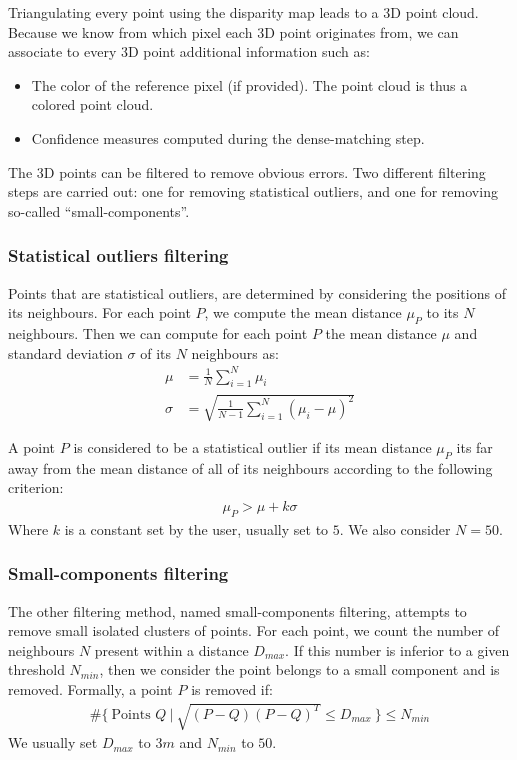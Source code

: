 Triangulating every point using the disparity map leads to a 3D point cloud. Because we know from which pixel each 3D point originates from, we can associate to every 3D point additional information such as:
\begin{itemize}
    \item The color of the reference pixel (if provided). The point cloud is thus a colored point cloud.
    \item Confidence measures computed during the dense-matching step. 
\end{itemize}

The 3D points can be filtered to remove obvious errors. Two different filtering steps are carried out: one for removing statistical outliers, and one for removing so-called ``small-components''. 
\subsubsection{Statistical outliers filtering}
Points that are statistical outliers, are determined by considering the positions of its neighbours. For each point $P$, we compute the mean distance $\mu_P$ to its $N$ neighbours. Then we can compute for each point $P$ the mean distance $\mu$ and standard deviation $\sigma$ of its $N$ neighbours as:
\begin{align}
    \mu &= \frac{1}{N}\sum_{i=1}^N\mu_i\\
    \sigma &= \sqrt{\frac{1}{N-1}\sum_{i=1}^N(\mu_i-\mu)^2}
\end{align}

A point $P$ is considered to be a statistical outlier if its mean distance $\mu_P$ its far away from the mean distance of all of its neighbours according to the following criterion:
\begin{align}
    \mu_P>\mu+k\sigma
\end{align}
Where $k$ is a constant set by the user, usually set to $5$. We also consider $N=50$.

\subsubsection{Small-components filtering}
The other filtering method, named small-components filtering, attempts to remove small isolated clusters of points. For each point, we count the number of neighbours $N$ present within a distance $D_{max}$. If this number is inferior to a given threshold $N_{min}$, then we consider the point belongs to a small component and is removed. Formally, a point $P$ is removed if:
\begin{align}
    \#\{~\text{Points } Q~|~\sqrt{(P-Q)(P-Q)^T}\leqslant D_{max}~\}\leqslant N_{min}
\end{align}
We usually set $D_{max}$ to $3m$ and $N_{min}$ to $50$.

